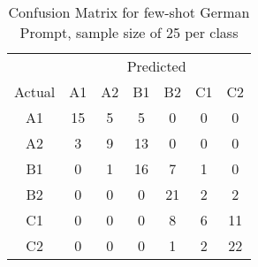 \begin{table}[ht]
    \centering
    \begin{tabular}{c|cccccc}
        & \multicolumn{6}{c}{Predicted} \\
        Actual & A1 & A2 & B1 & B2 & C1 & C2 \\
        \hline
        A1 & \cellcolor[rgb]{0.46,0.88,0.46}15 & \cellcolor[rgb]{0.8,0.96,0.8}5 & \cellcolor[rgb]{0.8,0.96,0.8}5 & \cellcolor[rgb]{1,1,1}0 & \cellcolor[rgb]{1,1,1}0 & \cellcolor[rgb]{1,1,1}0 \\
        A2 & \cellcolor[rgb]{0.9,0.98,0.9}3 & \cellcolor[rgb]{0.66,0.93,0.66}9 & \cellcolor[rgb]{0.54,0.9,0.54}13 & \cellcolor[rgb]{1,1,1}0 & \cellcolor[rgb]{1,1,1}0 & \cellcolor[rgb]{1,1,1}0 \\
        B1 & \cellcolor[rgb]{1,1,1}0 & \cellcolor[rgb]{0.97,1,0.97}1 & \cellcolor[rgb]{0.42,0.87,0.42}16 & \cellcolor[rgb]{0.72,0.95,0.72}7 & \cellcolor[rgb]{0.97,1,0.97}1 & \cellcolor[rgb]{1,1,1}0 \\
        B2 & \cellcolor[rgb]{1,1,1}0 & \cellcolor[rgb]{1,1,1}0 & \cellcolor[rgb]{1,1,1}0 & \cellcolor[rgb]{0.28,0.83,0.28}21 & \cellcolor[rgb]{0.93,0.99,0.93}2 & \cellcolor[rgb]{0.93,0.99,0.93}2 \\
        C1 & \cellcolor[rgb]{1,1,1}0 & \cellcolor[rgb]{1,1,1}0 & \cellcolor[rgb]{1,1,1}0 & \cellcolor[rgb]{0.69,0.94,0.69}8 & \cellcolor[rgb]{0.76,0.95,0.76}6 & \cellcolor[rgb]{0.58,0.91,0.58}11 \\
        C2 & \cellcolor[rgb]{1,1,1}0 & \cellcolor[rgb]{1,1,1}0 & \cellcolor[rgb]{1,1,1}0 & \cellcolor[rgb]{0.97,1,0.97}1 & \cellcolor[rgb]{0.93,0.99,0.93}2 & \cellcolor[rgb]{0.26,0.82,0.26}22 \\
    \end{tabular}
    \caption{Confusion Matrix for few-shot German Prompt, sample size of 25 per class}
    \label{tab:few_shot_confusion_matrix}
\end{table}

